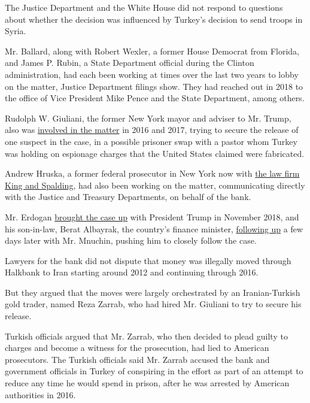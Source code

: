 The Justice Department and the White House did not respond to questions
about whether the decision was influenced by Turkey's decision to send
troops in Syria.

Mr. Ballard, along with Robert Wexler, a former House Democrat from
Florida, and James P. Rubin, a State Department official during the
Clinton administration, had each been working at times over the last two
years to lobby on the matter, Justice Department filings show. They had
reached out in 2018 to the office of Vice President Mike Pence and the
State Department, among others.

Rudolph W. Giuliani, the former New York mayor and adviser to Mr. Trump,
also was
\href{https://www.nytimes.com/2019/10/10/us/politics/giuliani-trump-rex-tillerson.html}{involved
in the matter} in 2016 and 2017, trying to secure the release of one
suspect in the case, in a possible prisoner swap with a pastor whom
Turkey was holding on espionage charges that the United States claimed
were fabricated.

Andrew Hruska, a former federal prosecutor in New York now with
\href{https://www.kslaw.com/people/andrew-hruska}{the law firm King and
Spalding}, had also been working on the matter, communicating directly
with the Justice and Treasury Departments, on behalf of the bank.

Mr. Erdogan
\href{http://www.hurriyetdailynews.com/erdogan-says-trump-promised-to-instruct-us-ministers-on-halkbank-case-138545}{brought
the case up} with President Trump in November 2018, and his son-in-law,
Berat Albayrak, the country's finance minister,
\href{https://www.reuters.com/article/us-turkey-usa-halkbank-minister/turkish-finance-minister-upbeat-over-halkbank-sanctions-busting-case-idUSKCN1NA1FF}{following
up} a few days later with Mr. Mnuchin, pushing him to closely follow the
case.

Lawyers for the bank did not dispute that money was illegally moved
through Halkbank to Iran starting around 2012 and continuing through
2016.

But they argued that the moves were largely orchestrated by an
Iranian-Turkish gold trader, named Reza Zarrab, who had hired Mr.
Giuliani to try to secure his release.

Turkish officials argued that Mr. Zarrab, who then decided to plead
guilty to charges and become a witness for the prosecution, had lied to
American prosecutors. The Turkish officials said Mr. Zarrab accused the
bank and government officials in Turkey of conspiring in the effort as
part of an attempt to reduce any time he would spend in prison, after he
was arrested by American authorities in 2016.

